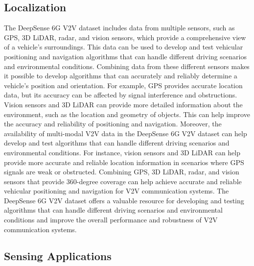 \documentclass[10pt,comsoc]{IEEEtran}
\begin{document}
\subsection{Localization}
The DeepSense 6G V2V dataset includes data from multiple sensors, such as GPS, 3D LiDAR, radar, and vision sensors, which provide a comprehensive view of a vehicle's surroundings. This data can be used to develop and test vehicular positioning and navigation algorithms that can handle different driving scenarios and environmental conditions. Combining data from these different sensors makes it possible to develop algorithms that can accurately and reliably determine a vehicle's position and orientation. For example, GPS provides accurate location data, but its accuracy can be affected by signal interference and obstructions. Vision sensors and 3D LiDAR can provide more detailed information about the environment, such as the location and geometry of objects. This can help improve the accuracy and reliability of positioning and navigation. Moreover, the availability of multi-modal V2V data in the DeepSense 6G V2V dataset can help develop and test algorithms that can handle different driving scenarios and environmental conditions. For instance, vision sensors and 3D LiDAR can help provide more accurate and reliable location information in scenarios where GPS signals are weak or obstructed. Combining GPS, 3D LiDAR, radar, and vision sensors that provide 360-degree coverage can help achieve accurate and reliable vehicular positioning and navigation for V2V communication systems. The DeepSense 6G V2V dataset offers a valuable resource for developing and testing algorithms that can handle different driving scenarios and environmental conditions and improve the overall performance and robustness of V2V communication systems.


\subsection{Sensing Applications} \label{subsec:other_applications}
\end{document}
